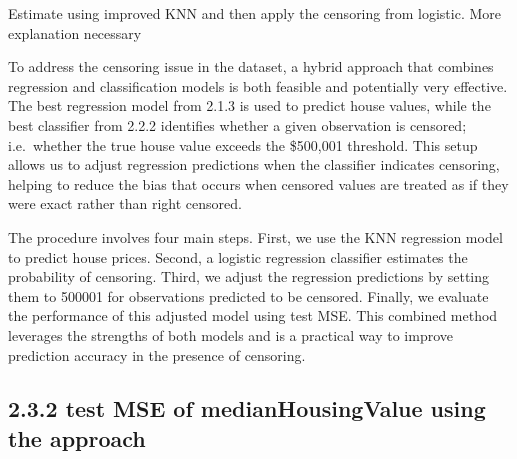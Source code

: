 \documentclass[
]{article}
\begin{document}
Estimate using improved KNN and then apply the censoring from logistic.
More explanation necessary

To address the censoring issue in the dataset, a hybrid approach that
combines regression and classification models is both feasible and
potentially very effective. The best regression model from 2.1.3 is used
to predict house values, while the best classifier from 2.2.2 identifies
whether a given observation is censored; i.e.~whether the true house
value exceeds the \$500,001 threshold. This setup allows us to adjust
regression predictions when the classifier indicates censoring, helping
to reduce the bias that occurs when censored values are treated as if
they were exact rather than right censored.

The procedure involves four main steps. First, we use the KNN regression
model to predict house prices. Second, a logistic regression classifier
estimates the probability of censoring. Third, we adjust the regression
predictions by setting them to 500001 for observations predicted to be
censored. Finally, we evaluate the performance of this adjusted model
using test MSE. This combined method leverages the strengths of both
models and is a practical way to improve prediction accuracy in the
presence of censoring.

\subsection{2.3.2 test MSE of medianHousingValue using the
approach}\label{test-mse-of-medianhousingvalue-using-the-approach}
\end{document}
